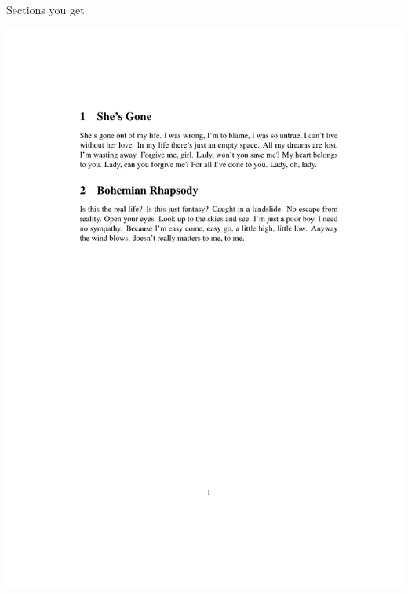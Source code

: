 \documentclass[12pt]{gshs_lecture}
\begin{document}
\begin{frame}[t]{Sections}\small
you get
\begin{center}
\begin{framed}
\includegraphics[width=\textwidth,trim={1cm 18cm 1cm 4cm},clip]{./test_article/article002.pdf}
\end{framed}
\end{center}
\end{frame}
\end{document}
